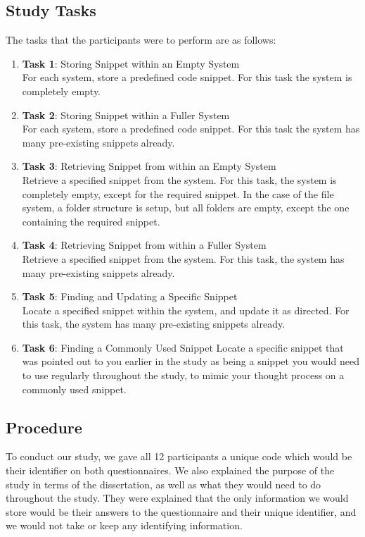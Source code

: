 \subsection{Study Tasks} \label{tasks}
The tasks that the participants were to perform are as follows:
\begin{enumerate}
\item \textbf{Task 1}: Storing Snippet within an Empty System \\
For each system, store a predefined code snippet. For this task the system is completely empty.
\item \textbf{Task 2}: Storing Snippet within a Fuller System \\
For each system, store a predefined code snippet. For this task the system has many pre-existing snippets already.
\item \textbf{Task 3}: Retrieving Snippet from within an Empty System \\
Retrieve a specified snippet from the system. For this task, the system is completely empty, except for the required snippet. In the case of the file system, a folder structure is setup, but all folders are empty, except the one containing the required snippet.
\item \textbf{Task 4}: Retrieving Snippet from within a Fuller System \\
Retrieve a specified snippet from the system. For this task, the system has many pre-existing snippets already.
\item \textbf{Task 5}: Finding and Updating a Specific Snippet \\
Locate a specified snippet within the system, and update it as directed. For this task, the system has many pre-existing snippets already.
\item \textbf{Task 6}: Finding a Commonly Used Snippet
Locate a specific snippet that was pointed out to you earlier in the study as being a snippet you would need to use regularly throughout the study, to mimic your thought process on a commonly used snippet.
\end{enumerate}

\subsection{Procedure}
To conduct our study, we gave all 12 participants a unique code which would be their identifier on both questionnaires. 
We also explained the purpose of the study in terms of the dissertation, as well as what they would need to do throughout the study. 
They were explained that the only information we would store would be their answers to the questionnaire and their unique identifier, and we would not take or keep any identifying information.

